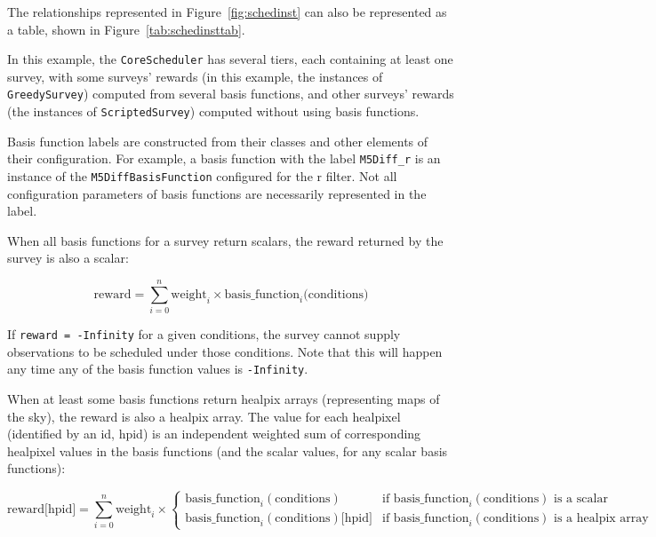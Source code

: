 \documentclass[OPS,lsstdraft,authoryear,toc]{lsstdoc}
\begin{document}
The relationships represented in Figure~\ref{fig:schedinst} can also be represented as a table, shown in Figure~\ref{tab:schedinsttab}.

In this example, the \texttt{CoreScheduler} has several tiers, each containing at least one survey, with some surveys' rewards (in this example, the instances of \texttt{GreedySurvey}) computed from several basis functions, and other surveys' rewards (the instances of \texttt{ScriptedSurvey}) computed without using basis functions.

Basis function labels are constructed from their classes and other elements of their configuration. For example, a basis function with the label \texttt{M5Diff\_r} is an instance of the \texttt{M5DiffBasisFunction} configured for the r filter. Not all configuration parameters of basis functions are necessarily represented in the label.

When all basis functions for a survey return scalars, the reward returned by the survey is also a scalar:

\begin{equation}
\textrm{reward} = \sum_{i=0}^{n} \textrm{weight}_{i} \times \textrm{basis\_function}_{i}(\textrm{conditions)}
\end{equation}

If \texttt{reward = -Infinity} for a given conditions, the survey cannot supply observations to be scheduled under those conditions. Note that this will happen any time any of the basis function values is \texttt{-Infinity}.

When at least some basis functions return healpix arrays (representing maps of the sky), the reward is also a healpix array. The value for each healpixel (identified by an id, hpid) is an independent weighted sum of corresponding healpixel values in the basis functions (and the scalar values, for any scalar basis functions):

\begin{equation}
\textrm{reward[hpid]} = \sum_{i=0}^{n} \textrm{weight}_{i} \times 
\begin{cases}
\textrm{basis\_function}_{i}(\textrm{conditions}) & \textrm{if basis\_function}_i(\textrm{conditions}) \textrm{ is a scalar} \\
\textrm{basis\_function}_{i}(\textrm{conditions})\textrm{[hpid]} & \textrm{if basis\_function}_i(\textrm{conditions}) \textrm{ is a healpix array}
\end{cases}
\end{equation}
\end{document}
